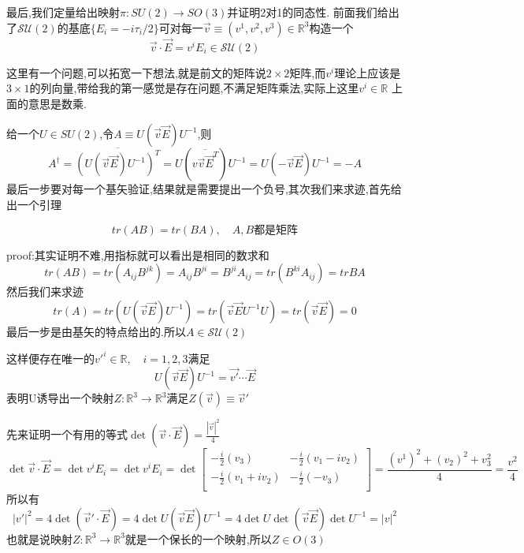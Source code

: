 \documentclass[../main.tex]{subfiles}
\begin{document}
最后,我们定量给出映射$\pi:SU(2)\rightarrow SO(3)$并证明2对1的同态性.
前面我们给出了$\mathscr{SU}(2)$的基底$\{E_i = -i\tau_i/2\}$可对每一$\vec{v}\equiv (v^1,v^2,v^3) \in \mathbb{R}^3$构造一个$$\vec{v}\cdot \vec{E} = v^iE_i \in \mathscr{SU}(2)$$
\begin{note}
这里有一个问题,可以拓宽一下想法,就是前文的矩阵说$2\times 2$矩阵,而$v^i$理论上应该是$3\times 1$的列向量,带给我的第一感觉是存在问题,不满足矩阵乘法,实际上这里$v^i \in \mathbb{R}$
上面的意思是数乘.
\end{note}
给一个$U\in SU(2)$,令$A \equiv U(\vec{v}\vec{E})U^{-1}$,则
$$A^\dagger = \overline{(U(\vec{v}\vec{E})U^{-1})^T} = U(\overline{v\vec{v}\vec{E}^T})U^{-1} =  U(-\vec{v}\vec{E})U^{-1} = -A$$
最后一步要对每一个基矢验证,结果就是需要提出一个负号,其次我们来求迹,首先给出一个引理
\begin{lemma}
    $$tr(AB) = tr(BA),\quad A,B\text{都是矩阵}$$
\end{lemma}
proof:其实证明不难,用指标就可以看出是相同的数求和
$$tr(AB) = tr(A_{ij}B^{jk}) = A_{ij}B^{ji} = B^{ji}A_{ij} = tr(B^{ki}A_{ij}) = tr{BA}$$
然后我们来求迹
$$tr(A) = tr(U(\vec{v}\vec{E})U^{-1}) = tr(\vec{v}\vec{E}U^{-1}U) = tr(\vec{v}\vec{E}) = 0$$
最后一步是由基矢的特点给出的.所以$A \in \mathscr{SU}(2)$

这样便存在唯一的$v'^i \in \mathbb{R},\quad i = 1,2,3 $满足
$$U(\vec{v}\vec{E})U^{-1} = \vec{v'}\cdots \vec{E}$$
表明U诱导出一个映射$Z:\mathbb{R}^3 \rightarrow \mathbb{R}^3$满足$Z(\vec{v}) \equiv \vec{v}'$

先来证明一个有用的等式$\det(\vec{v}\cdot \vec{E}) = \frac{|\vec{v}|^2}{4}$
$$\det{\vec{v}\cdot \vec{E}} = \det{v^i E_i} = \det{v^i E_i} = \det \begin{bmatrix}
    -\frac{i}{2}(v_3)&-\frac{i}{2}(v_1 - iv_2)\\
    -\frac{i}{2}(v_1 + iv_2)&-\frac{i}{2}(-v_3)\\
\end{bmatrix} = \frac{(v^1)^2 + (v_2)^2 +v_3^2}{4} = \frac{v^2}{4}$$
所以有$$|v'|^2 = 4 \det(\vec{v}' \cdot \vec{E}) = 4\det{U(\vec{v}\vec{E})U^{-1}}=4 \det U \det (\vec{v}\vec{E})\det U^{-1} = |v|^2 $$
也就是说映射$Z:\mathbb{R}^3 \rightarrow \mathbb{R}^3$就是一个保长的一个映射,所以$Z\in O(3)$
\end{document}
